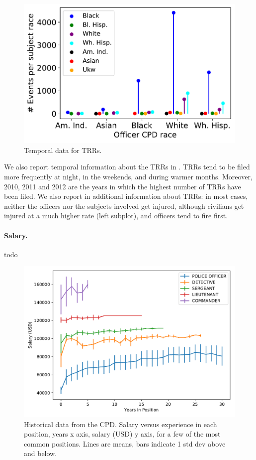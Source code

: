 \begin{figure}[h] 
	\includegraphics[width=\textwidth]{figs/trr_stats_race_race} 
	\caption{Temporal data for TRRs.} \label{fig:trrs_stats2}
\end{figure}

We also report temporal information about the TRRs in . TRRs tend to be filed more frequently at night, in the weekends, and during warmer months. Moreover, 2010, 2011 and 2012 are the years in which the highest number of TRRs have been filed. We also report in  additional information about TRRs: in most cases, neither the officers nor the subjects involved get injured, although civilians get injured at a much higher rate (left subplot), and officers tend to fire first. 
\paragraph{Salary.} todo

\begin{figure}[h] 
\includegraphics[width=\textwidth]{figs/salary} 
\caption{Historical data from the CPD. Salary versus experience in each
position, years x axis, salary (USD) y axis, for a few of the most common
positions. Lines are means, bars indicate 1 std dev above and below.} \label{fig:salary}
\end{figure}

